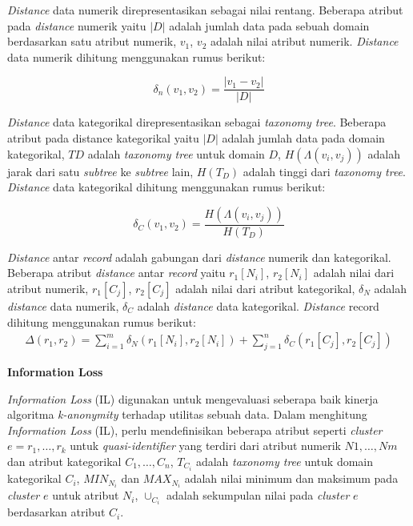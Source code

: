 \documentclass[a4paper,twoside]{article}
\begin{document}
\begin{enumerate}
\textit{Distance} data numerik direpresentasikan sebagai nilai rentang. Beberapa atribut pada \textit{distance} numerik yaitu $|D|$ adalah jumlah data pada sebuah domain berdasarkan satu atribut numerik, $v_1$, $v_2$ adalah nilai atribut numerik. \textit{Distance} data numerik dihitung menggunakan rumus berikut:

\begin{equation}
\delta_n(v_1,v_2) = \frac{|v_1 - v_2|}{|D|} 
\end{equation}

\textit{Distance} data kategorikal direpresentasikan sebagai \textit{taxonomy tree}. Beberapa atribut pada distance kategorikal yaitu $|D|$ adalah jumlah data pada domain kategorikal, $TD$ adalah \textit{taxonomy tree} untuk domain $D$,  $H(\Lambda(v_i,v_j))$ adalah jarak dari satu \textit{subtree} ke \textit{subtree} lain, $H(T_D)$ adalah tinggi dari \textit{taxonomy tree}. \textit{Distance} data kategorikal dihitung menggunakan rumus berikut:

\begin{equation}
\delta_C(v_1,v_2) = \frac{H(\Lambda(v_i,v_j))}{H(T_D)} 
\end{equation}

\textit{Distance} antar \textit{record} adalah gabungan dari \textit{distance} numerik dan kategorikal. Beberapa atribut \textit{distance} antar \textit{record} yaitu $r_1[N_i]$, $r_2[N_i]$ adalah nilai dari atribut numerik, $r_1[C_j]$, $r_2[C_j]$ adalah nilai dari atribut kategorikal, $\delta_N$ adalah \textit{distance} data numerik, $\delta_C$ adalah \textit{distance} data kategorikal. \textit{Distance} record dihitung menggunakan rumus berikut:
\begin{align}
\Delta (r_1,r_2) = \sum_{i=1}^{m} \delta_N(r_1[N_i],r_2	[N_i]) +  \sum_{j=1}^{n} \delta_C(r_1[C_j],r_2[C_j])
\end{align}


\textbf{Information Loss}

\textit{Information Loss} (IL) digunakan untuk mengevaluasi seberapa baik kinerja algoritma \textit{k-anonymity} terhadap utilitas sebuah data. Dalam menghitung \textit{Information Loss} (IL), perlu mendefinisikan beberapa atribut seperti \textit{cluster} $e = {r_1,\ldots,r_k}$  untuk \textit{quasi-identifier} yang terdiri dari atribut numerik ${N1,\ldots, Nm}$ dan atribut kategorikal ${C_1,\ldots,C_n}$, $T_{C_i}$ adalah \textit{taxonomy tree} untuk domain kategorikal $C_i$, $MIN_{N_i}$ dan $MAX_{N_i}$ adalah nilai minimum dan maksimum pada \textit{cluster} $e$ untuk atribut $N_i$, $\cup_{C_i}$ adalah sekumpulan nilai pada \textit{cluster} $e$ berdasarkan atribut $C_i$. \\


\end{enumerate}
\end{document}
